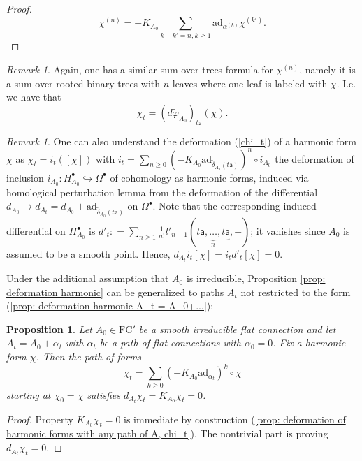 \documentclass[11pt,a4paper]{amsart}
\theoremstyle{plain} %
\newtheorem{prop}[thm]{Proposition}
\theoremstyle{definition}
\theoremstyle{remark}
\newtheorem{rem}[thm]{Remark}
\newcommand{\sfa}{\mathsf{a}}
\newcommand{\bt}{\bullet}
\newcommand{\ra}{\rightarrow}
\newcommand{\til}{\widetilde}
\newcommand{\ad}{\mathrm{ad}}
\newcommand{\FC}{\mathrm{FC}}
\begin{document}
{\begin{proof}
\begin{equation}
    \chi^{(n)} = -K_{A_0}\sum_{k+k' = n, k\geq 1} \mathrm{ad}_{\alpha^{(k)}}\chi^{(k')}. 
\end{equation}
\end{proof}
\begin{rem}\label{rem: sum over trees d til varphi}
    Again, one has a similar sum-over-trees formula for $\chi^{(n)}$, namely it is a sum over rooted binary trees  with $n$ leaves where one leaf is labeled with $\chi$. I.e. we have that 
    \begin{equation}
        \chi_t = (d\til{\varphi}_{A_0})_{t\sfa}(\chi).
    \end{equation}
\end{rem}

\begin{rem}\label{rem 2.18}
    One can also understand the deformation (\ref{chi_t}) of a harmonic form $\chi$ as $\chi_t=i_t ([\chi])$ with $i_t=\sum_{n\geq 0}(-K_{A_0}\ad_{\til\delta_{A_0}(t\sfa)})^n\circ i_{A_0}$ the deformation of inclusion $i_{A_0}\colon H_{A_0}^\bt\hookrightarrow \Omega^\bt$ of cohomology as harmonic forms, induced via homological perturbation lemma from the deformation of the differential $d_{A_0}\ra d_{A_t}=d_{A_0}+\ad_{\til\delta_{A_0}(t\sfa)}$ on $\Omega^\bt$. Note that the corresponding induced differential on $H_{A_0}^\bt$ is $d'_t\colon=\sum_{n\geq 1}\frac{1}{n!} l'_{n+1}(\underbrace{t\sfa,\ldots,t\sfa}_n,-)$; it vanishes since $A_0$ is assumed to be a smooth point. Hence, $d_{A_t}i_t [\chi]= i_t d'_t [\chi]=0$.
\end{rem}

Under the additional assumption that $A_0$ is irreducible, Proposition \ref{prop: deformation harmonic} can be generalized to paths $A_t$ not restricted to the form (\ref{prop: deformation harmonic A_t = A_0+...}):

\begin{prop}\label{prop: deformation of harmonic forms with any path of A}
    Let $A_0\in \FC'$ be a smooth irreducible flat connection and let $A_t=A_0+\alpha_t$ with $\alpha_t %
    $ be a path of flat connections with $\alpha_0=0$. Fix a harmonic form $\chi$. Then the path of forms
    \begin{equation}\label{prop: deformation of harmonic forms with any path of A, chi_t}
        \chi_t=\sum_{k\geq 0} (-K_{A_0} \ad_{\alpha_t})^k\circ \chi
    \end{equation}
    starting at $\chi_{0}=\chi$ satisfies  $d_{A_t}\chi_t=K_{A_0}\chi_t=0$.
\end{prop}
\begin{proof}
Property $K_{A_0}\chi_t=0$ is immediate by construction (\ref{prop: deformation of harmonic forms with any path of A, chi_t}). The nontrivial part is proving $d_{A_t}\chi_t=0$.


\end{proof}}
\end{document}
